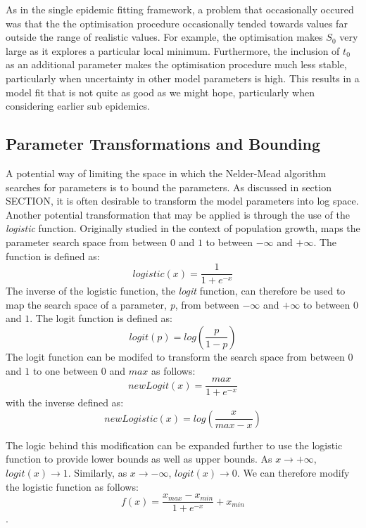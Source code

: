 As in the single epidemic fitting framework, a problem that
occasionally occured was that the the optimisation procedure
occasionally tended towards values far outside the range of realistic
values. For example, the optimisation makes $S_0$ very large as it
explores a particular local minimum. Furthermore, the inclusion of
$t_0$ as an additional parameter makes the optimisation procedure much
less stable, particularly when uncertainty in other model parameters
is high. This results in a model fit that is not quite as good as we
might hope, particularly when considering earlier sub epidemics. 


\subsection{Parameter Transformations and Bounding}
A potential way of limiting the space in which the Nelder-Mead
algorithm searches for parameters is to bound the parameters. As
discussed in section SECTION, it is often desirable to transform the model parameters into log space. Another potential transformation that may be applied is through the
use of the \emph{logistic} function. Originally studied in the context
of population growth, maps the parameter search space from between $0$ and $1$
to between $-\infty$ and $+\infty$. The function is
defined as:
\begin{equation}
logistic(x)=\frac{1}{1+e^{-x}}
\end{equation}
The inverse of the logistic function, the \emph{logit} function, can
therefore be used to map the search space of a parameter, \emph{p},
from between $-\infty$ and $+\infty$ to between $0$ and $1$. The logit
function is defined as:
\begin{equation}
logit(p) = log(\frac{p}{1-p})
\end{equation}
The logit function can be modifed to transform the search space from
between $0$ and $1$ to one between $0$ and $max$ as follows:
\begin{equation}
newLogit(x) = \frac{max}{1+e^{-x}}
\end{equation}
with the inverse defined as:
\begin{equation}
newLogistic(x)=log(\frac{x}{max-x})
\end{equation}

 The logic behind this modification can be expanded further to use the logistic function to provide lower bounds as well as upper bounds. As
$x\rightarrow +\infty$, $logit(x)\rightarrow 1$. Similarly, as
$x\rightarrow-\infty$, $logit(x)\rightarrow 0$. We can therefore modify
the logistic function as follows:
\begin{equation}
f(x) = \frac{x_{max}-x_{min}}{1+e^{-x}} + x_{min}
\end{equation}.

